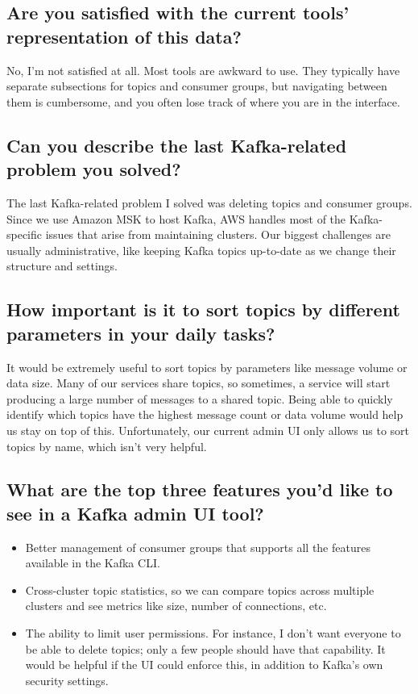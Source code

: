 \documentclass[10pt , a4paper]{report}
\begin{document}
\subsection*{Are you satisfied with the current tools’ representation of this data?}

No, I’m not satisfied at all. Most tools are awkward to use. They typically have separate subsections for topics and consumer groups, but navigating between them is cumbersome, and you often lose track of where you are in the interface.

\subsection*{Can you describe the last Kafka-related problem you solved?}

The last Kafka-related problem I solved was deleting topics and consumer groups. Since we use Amazon MSK to host Kafka, AWS handles most of the Kafka-specific issues that arise from maintaining clusters. Our biggest challenges are usually administrative, like keeping Kafka topics up-to-date as we change their structure and settings.

\subsection*{How important is it to sort topics by different parameters in your daily tasks?}

It would be extremely useful to sort topics by parameters like message volume or data size. Many of our services share topics, so sometimes, a service will start producing a large number of messages to a shared topic. Being able to quickly identify which topics have the highest message count or data volume would help us stay on top of this. Unfortunately, our current admin UI only allows us to sort topics by name, which isn’t very helpful.

\subsection*{What are the top three features you’d like to see in a Kafka admin UI tool?}

\begin{itemize}
    \item Better management of consumer groups that supports all the features available in the Kafka CLI.
    \item Cross-cluster topic statistics, so we can compare topics across multiple clusters and see metrics like size, number of connections, etc.
    \item The ability to limit user permissions. For instance, I don’t want everyone to be able to delete topics; only a few people should have that capability. It would be helpful if the UI could enforce this, in addition to Kafka’s own security settings.
\end{itemize}
\end{document}

